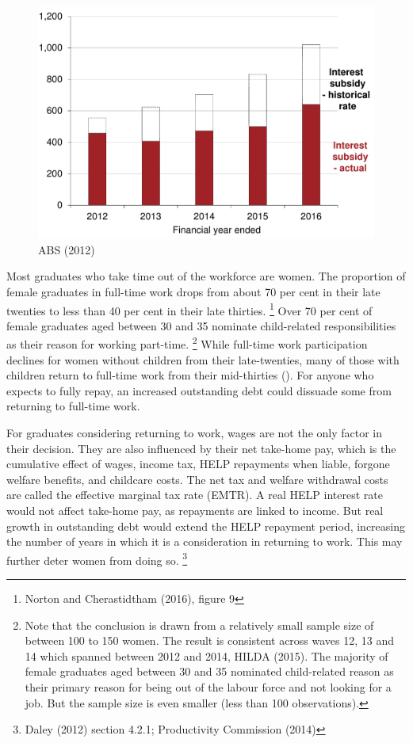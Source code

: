 \documentclass[embargoed]{grattan}
\begin{document}
{\begin{figure}
\includegraphics[page=16]{atlas/Chartpack.pdf}
{ABS (2012)}
\end{figure}

Most graduates who take time out of the workforce are women.
The proportion of female graduates in full-time work drops from about 70 per cent in their late twenties to less than 40 per cent in their late thirties.%
\footnote{Norton and Cherastidtham (2016), figure 9} Over 70 per cent of female graduates aged between 30 and 35 nominate child-related responsibilities as their reason for working part-time.%
\footnote{Note that the conclusion is drawn from a relatively small sample size of between 100 to 150 women.
The result is consistent across waves 12, 13 and 14 which spanned between 2012 and 2014, HILDA (2015).
The majority of female graduates aged between 30 and 35 nominated child-related reason as their primary reason for being out of the labour force and not looking for a job.
But the sample size is even smaller (less than 100 observations).} While full-time work participation declines for women without children from their late-twenties, many of those with children return to full-time work from their mid-thirties ().
For anyone who expects to fully repay, an increased outstanding debt could dissuade some from returning to full-time work.

For graduates considering returning to work, wages are not the only factor in their decision.
They are also influenced by their net take-home pay, which is the cumulative effect of wages, income tax, \gls{HELP} repayments when liable, forgone welfare benefits, and childcare costs.
The net tax and welfare withdrawal costs are called the effective marginal tax rate (EMTR).
A real \gls{HELP} interest rate would not affect take-home pay, as repayments are linked to income.
But real growth in outstanding debt would extend the \gls{HELP} repayment period, increasing the number of years in which it is a consideration in returning to work.
This may further deter women from doing so.%
\footnote{Daley (2012) section 4.2.1; Productivity Commission (2014)}


}
\end{document}
